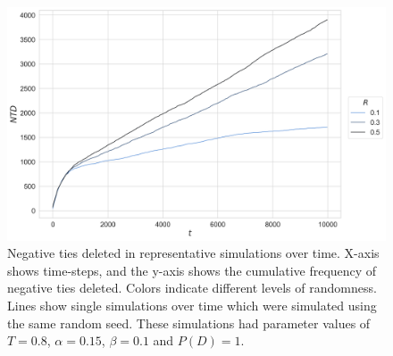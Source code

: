 \documentclass{article}
\begin{document}
\begin{figure}[H]
    \centering
    \includegraphics[width=.8\linewidth]{../plots/example/Example_Negative_Ties_Deleted.png}
  \caption{Negative ties deleted in representative simulations over time. X-axis shows time-steps, and the y-axis shows the cumulative frequency of negative ties deleted. Colors indicate different levels of randomness. Lines show single simulations over time which were simulated using the same random seed. These simulations had parameter values of $T = 0.8$, $\alpha = 0.15$, $\beta = 0.1$ and $P(D)=1$.}
  \label{fig:example_ntd}
\end{figure}
\end{document}
